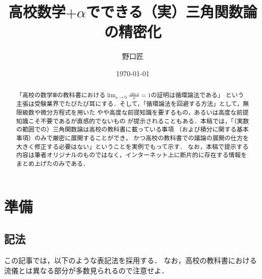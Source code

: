 \documentclass[11pt,a4paper]{ltjsarticle}
\title{高校数学$+\alpha$でできる（実）三角関数論の精密化}
\author{野口匠}
\affil{高知工科大学大学院工学研究科}
\date{\today}
\theoremstyle{definition}
\begin{document}
%
\maketitle

\begin{abstract}
  「高校の数学Ⅲの教科書における$\lim_{x \to 0} \frac{\sin x}{x} = 1$の証明は循環論法である」
  という主張は受験業界でたびたび耳にする．そして，「循環論法を回避する方法」として，無限級数や微分方程式を用いた
  やや高度な前提知識を要するもの，あるいは高度な前提知識こそ不要であるが直感的でないもの
  が提示されることもある．本稿では，「（実数の範囲での）三角関数論は高校の教科書に載っている事項
  （および積分に関する基本事項）のみで厳密に展開することができ，
  かつ高校の教科書での議論の展開の仕方を大きく修正する必要はない」ということを実例でもって示す．
  なお，本稿で提示する内容は筆者オリジナルのものではなく，インターネット上に断片的に存在する情報をまとめ上げたのみである．
\end{abstract}


\section{準備} \label{sec:pre}

\subsection{記法} \label{subsec:notation}

この記事では，以下のような表記法を採用する．
なお，高校の教科書における流儀とは異なる部分が多数見られるので注意せよ．
\end{document}
